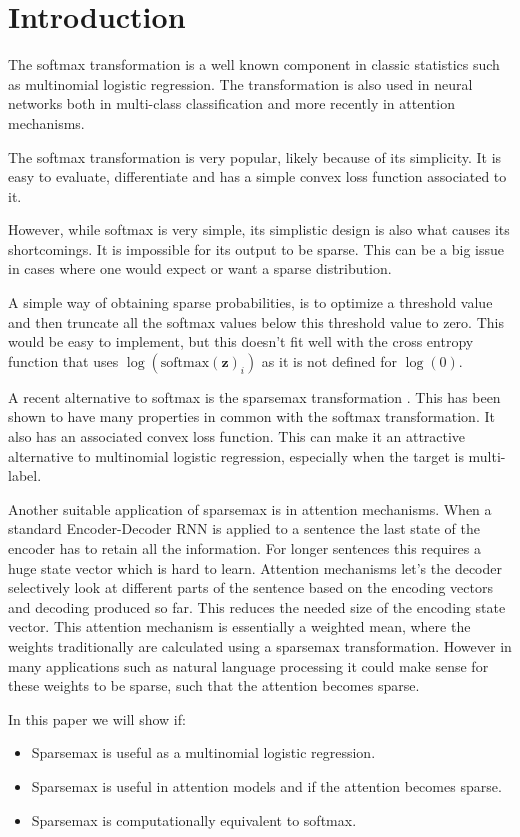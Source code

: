 \section{Introduction}

The softmax transformation is a well known component in classic statistics such as multinomial logistic regression. The transformation is also used in neural networks both in multi-class classification and more recently in attention mechanisms.

The softmax transformation is very popular, likely because of its simplicity. It is easy to evaluate, differentiate and has a simple convex loss function associated to it.

However, while softmax is very simple, its simplistic design is also what causes its shortcomings. It is impossible for its output to be sparse. This can be a big issue in cases where one would expect or want a sparse distribution.

A simple way of obtaining sparse probabilities, is to optimize a threshold value and then truncate all the softmax values below this threshold value to zero. This would be easy to implement, but this doesn't fit well with the cross entropy function that uses $\log(\mathrm{softmax}(\mathbf{z})_i)$ as it is not defined for $\log(0)$.

A recent alternative to softmax is the sparsemax transformation \cite{sparsemax}. This has been shown to have many properties in common with the softmax transformation. It also has an associated convex loss function. This can make it an attractive alternative to multinomial logistic regression, especially when the target is multi-label.

Another suitable application of sparsemax is in attention mechanisms. When a standard Encoder-Decoder RNN is applied to a sentence the last state of the encoder has to retain all the information. For longer sentences this requires a huge state vector which is hard to learn. Attention mechanisms let's the decoder selectively look at different parts of the sentence based on the encoding vectors and decoding produced so far. This reduces the needed size of the encoding state vector. This attention mechanism is essentially a weighted mean, where the weights traditionally are calculated using a sparsemax transformation. However in many applications such as natural language processing it could make sense for these weights to be sparse, such that the attention becomes sparse.

In this paper we will show if:
\begin{itemize}
\setlength\itemsep{-0.3em}
\item Sparsemax is useful as a multinomial logistic regression.
\item Sparsemax is useful in attention models and if the attention becomes sparse.
\item Sparsemax is computationally equivalent to softmax.
\end{itemize}
